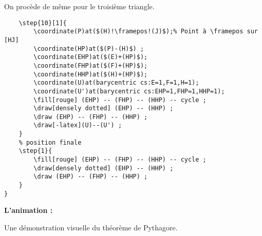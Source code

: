 \documentclass[a4paper,12pt]{article}
\begin{document}
On procède de même pour le troisième triangle.

\begin{lstlisting}[name=exemplecomplet]
	% déplacement du troisième triangle
	\step{10}[1]{
		\coordinate(P)at($(H)!\framepos!(J)$);% Point à \framepos sur [HJ]
		\coordinate(HP)at($(P)-(H)$) ;
		\coordinate(EHP)at($(E)+(HP)$);
		\coordinate(FHP)at($(F)+(HP)$);
		\coordinate(HHP)at($(H)+(HP)$);
		\coordinate(U)at(barycentric cs:E=1,F=1,H=1);
		\coordinate(U')at(barycentric cs:EHP=1,FHP=1,HHP=1);
		\fill[rouge] (EHP) -- (FHP) -- (HHP) -- cycle ;
		\draw[densely dotted] (EHP) -- (HHP) ;
		\draw (EHP) -- (FHP) -- (HHP) ;
		\draw[-latex](U)--(U') ;
	}
	% position finale
	\step{1}{
		\fill[rouge] (EHP) -- (FHP) -- (HHP) -- cycle ;
		\draw[densely dotted] (EHP) -- (HHP) ;
		\draw (EHP) -- (FHP) -- (HHP) ;
	}
}
\end{lstlisting}

\textbf{L'animation :}

Une démonstration visuelle du théorème de Pythagore.

\gdef\aLen{5}
\gdef\bLen{2}
\pgfmathsetmacro{\cLen}{sqrt(\aLen^2+\bLen^2)}
\end{document}
